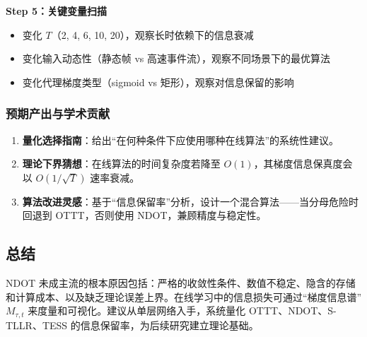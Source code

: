 \documentclass[journal,12pt,onecolumn]{IEEEtran}
\begin{document}
\textbf{Step 5：关键变量扫描}
\begin{itemize}
    \item 变化 \(T\)（2, 4, 6, 10, 20），观察长时依赖下的信息衰减
    \item 变化输入动态性（静态帧 vs 高速事件流），观察不同场景下的最优算法
    \item 变化代理梯度类型（sigmoid vs 矩形），观察对信息保留的影响
\end{itemize}

\subsubsection{预期产出与学术贡献}

\begin{enumerate}
    \item \textbf{量化选择指南}：给出“在何种条件下应使用哪种在线算法”的系统性建议。
    \item \textbf{理论下界猜想}：在线算法的时间复杂度若降至 \(O(1)\)，其梯度信息保真度会以 \(O(1/\sqrt{T})\) 速率衰减。
    \item \textbf{算法改进灵感}：基于“信息保留率”分析，设计一个混合算法——当分母危险时回退到 OTTT，否则使用 NDOT，兼顾精度与稳定性。
\end{enumerate}

\subsection{总结}

NDOT 未成主流的根本原因包括：严格的收敛性条件、数值不稳定、隐含的存储和计算成本、以及缺乏理论误差上界。在线学习中的信息损失可通过“梯度信息谱” \(M_{\tau,t}\) 来度量和可视化。建议从单层网络入手，系统量化 OTTT、NDOT、S-TLLR、TESS 的信息保留率，为后续研究建立理论基础。





\end{document}
